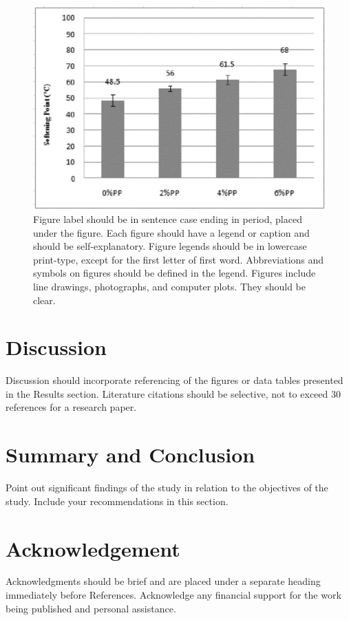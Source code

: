 \documentclass{strrespaper-journ}
\begin{document}
	        \begin{figure}[htbp]
	            \centering
	            \includegraphics[width=\linewidth]{../sample/graphics/bar_graph}
	            \caption{Figure label should be in sentence case ending in period, placed under the figure.  Each figure should have a legend or caption and should be self-explanatory. Figure legends should be in lowercase print-type, except for the first letter of first word. Abbreviations and symbols on figures should be defined in the legend. Figures include line drawings, photographs, and computer plots. They should be clear.}
	            \label{fig:bar_graph}
	        \end{figure}

    \section{Discussion}
	    Discussion should incorporate referencing of the figures or data tables presented in the Results section. Literature citations should be selective, not to exceed 30 references for a research paper.

    \section{Summary and Conclusion}
	    Point out significant findings of the study in relation to the objectives of the study. Include your recommendations in this section.

    \section{Acknowledgement}
	    Acknowledgments should be brief and are placed under a separate heading immediately before References. Acknowledge any financial support for the work being published and personal assistance.

	    \nocite{letcher_wind_2017}
	    \nocite{al-shemmeri_wind_2010}
	    \nocite{trewby_wind_2014}

    \printbibliography
\end{document}

